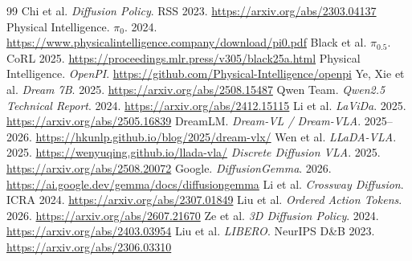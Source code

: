 \documentclass{article}
\begin{document}
\begin{thebibliography}{99}
 Chi et al. \textit{Diffusion Policy}. RSS 2023. \url{https://arxiv.org/abs/2303.04137}
 Physical Intelligence. \textit{$\pi_0$}. 2024. \url{https://www.physicalintelligence.company/download/pi0.pdf}
 Black et al. \textit{$\pi_{0.5}$}. CoRL 2025. \url{https://proceedings.mlr.press/v305/black25a.html}
 Physical Intelligence. \textit{OpenPI}. \url{https://github.com/Physical-Intelligence/openpi}
 Ye, Xie et al. \textit{Dream 7B}. 2025. \url{https://arxiv.org/abs/2508.15487}
 Qwen Team. \textit{Qwen2.5 Technical Report}. 2024. \url{https://arxiv.org/abs/2412.15115}
 Li et al. \textit{LaViDa}. 2025. \url{https://arxiv.org/abs/2505.16839}
 DreamLM. \textit{Dream-VL / Dream-VLA}. 2025--2026. \url{https://hkunlp.github.io/blog/2025/dream-vlx/}
 Wen et al. \textit{LLaDA-VLA}. 2025. \url{https://wenyuqing.github.io/llada-vla/}
 \textit{Discrete Diffusion VLA}. 2025. \url{https://arxiv.org/abs/2508.20072}
 Google. \textit{DiffusionGemma}. 2026. \url{https://ai.google.dev/gemma/docs/diffusiongemma}
 Li et al. \textit{Crossway Diffusion}. ICRA 2024. \url{https://arxiv.org/abs/2307.01849}
 Liu et al. \textit{Ordered Action Tokens}. 2026. \url{https://arxiv.org/abs/2607.21670}
 Ze et al. \textit{3D Diffusion Policy}. 2024. \url{https://arxiv.org/abs/2403.03954}
 Liu et al. \textit{LIBERO}. NeurIPS D\&B 2023. \url{https://arxiv.org/abs/2306.03310}
\end{thebibliography}
\end{document}
